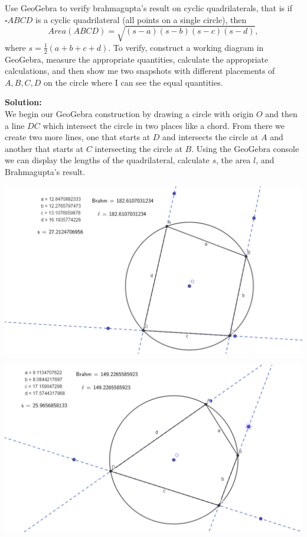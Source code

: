 \documentclass[12pt]{article}
\makeatletter
\theoremstyle{homework}
\newenvironment{exercise}[1]
{\def\@currentlabel{#1}\exercisecore}
{\endexercisecore}
\newcommand{\localhead}[1]{\par\smallskip\noindent\textbf{#1}\nobreak\\}%
\newcommand\solution{\localhead{Solution:}}
\makeatother
\begin{document}
\begin{exercise}{1} Use GeoGebra to verify brahmagupta's result on cyclic quadrilaterals, that is if $\square ABCD$ is a cyclic 
  quadrilateral (all points on a single circle), then
  \begin{equation*}
    Area(ABCD) = \sqrt{(s - a)(s - b)(s - c)(s - d)},
  \end{equation*}
  where $s = \frac{1}{2}(a+b+c+d)$. To verify, construct a working diagram in GeoGebra, measure the appropriate quantities, calculate the appropriate
  calculations, and then show me two snapshots with different placements of $A,B,C,D$ on the circle where I can see the equal quantities.\\ 

  \solution We begin our GeoGebra construction by drawing a circle with origin $O$ and then a line $DC$ which intersect the circle in two places like a chord.
  From there we create two more lines, one that starts at $D$ and intersects the circle at $A$ and another that starts at $C$ intersecting the circle at 
  $B$. Using the GeoGebra console we can display the lengths of the quadrilateral, calculate $s$, the area $l$, and Brahmagupta's result.
  
  \begin{center}
    \includegraphics[width = \textwidth]{bram1.png}
  \end{center}  
  \vspace{.15in}


  \begin{center}
    \includegraphics[width = \textwidth]{bram2.png}
  \end{center}  

\end{exercise}
\vspace{.5in}
\end{document}
